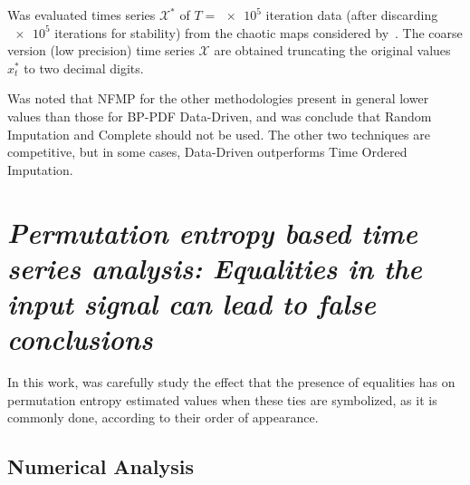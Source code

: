 \documentclass[11pt]{article}
\begin{document}

Was evaluated times series $\mathcal{X^{*}}$ of $T = \num[scientific-notation=true]{e5}$ iteration data (after discarding $\num[scientific-notation=true]{e5}$ iterations for stability) from the chaotic maps considered by~. 
The coarse version (low precision) time series $\mathcal{X}$ are obtained truncating the original values $x^*_t$ to two decimal digits.

Was noted that NFMP for the other methodologies present in general lower values than those for BP-PDF Data-Driven, and was conclude that Random Imputation and Complete should not be used. 
The other two techniques are competitive, but in some cases, Data-Driven outperforms Time Ordered Imputation.
\newpage

\section*{\textbf{\textit{Permutation entropy based time series analysis: Equalities in the input signal can lead to false conclusions}}~\cite{zunino2017permutation}}

In this work, was carefully study the effect that the presence of equalities has on permutation entropy estimated values when these ties are symbolized, as it is commonly done, according to their order of appearance. 

\subsection*{Numerical Analysis}
\end{document}
